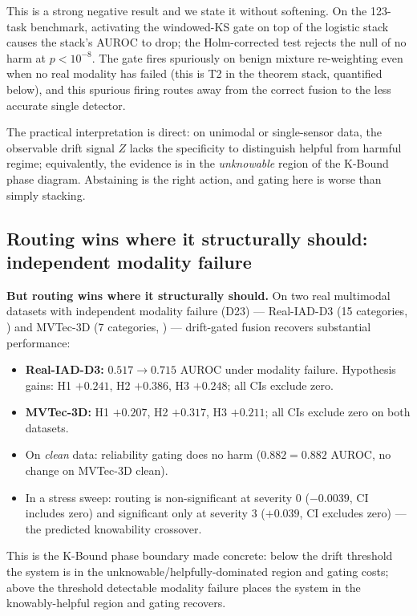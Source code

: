 This is a strong negative result and we state it without softening.  On the 123-task
benchmark, activating the windowed-KS gate on top of the logistic stack causes the
stack's AUROC to drop; the Holm-corrected test rejects the null of no harm at
$p < 10^{-8}$.  The gate fires spuriously on benign mixture re-weighting even when
no real modality has failed (this is T2 in the theorem stack, quantified below), and
this spurious firing routes away from the correct fusion to the less accurate single
detector.

The practical interpretation is direct: on unimodal or single-sensor data, the
observable drift signal $Z$ lacks the specificity to distinguish helpful from harmful
regime; equivalently, the evidence is in the \emph{unknowable} region of the K-Bound
phase diagram.  Abstaining is the right action, and gating here is worse than
simply stacking.

\subsection{Routing wins where it structurally should: independent modality failure}\label{sec:elara-routing-pos}

\textbf{But routing wins where it structurally should.}  On two real multimodal
datasets with independent modality failure (D23) --- Real-IAD-D3 (15 categories,
\cite{wang2024realiad}) and MVTec-3D (7 categories,
\cite{bergmann2022mvtec3d,bergmann2019mvtec}) --- drift-gated fusion recovers
substantial performance:

\begin{itemize}
\item \textbf{Real-IAD-D3:} $0.517 \to 0.715$ AUROC under modality failure.
  Hypothesis gains: H1 $+0.241$, H2 $+0.386$, H3 $+0.248$; all CIs exclude zero.
\item \textbf{MVTec-3D:} H1 $+0.207$, H2 $+0.317$, H3 $+0.211$; all CIs exclude
  zero on both datasets.
\item On \emph{clean} data: reliability gating does no harm ($0.882 = 0.882$ AUROC,
  no change on MVTec-3D clean).
\item In a stress sweep: routing is non-significant at severity 0 ($-0.0039$,
  CI includes zero) and significant only at severity 3 ($+0.039$, CI excludes
  zero) --- the predicted knowability crossover.
\end{itemize}

This is the K-Bound phase boundary made concrete: below the drift threshold the
system is in the unknowable/helpfully-dominated region and gating costs; above the
threshold detectable modality failure places the system in the knowably-helpful
region and gating recovers.

